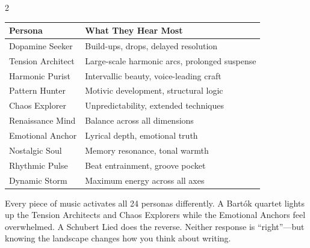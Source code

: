 \documentclass[10pt,a4paper]{article}
\begin{document}
\begin{multicols}{2}
\vspace{4pt}

{\small
\begin{tabular}{@{}p{2.5cm}p{4cm}@{}}
  \toprule
  \textbf{\sffamily Persona} & \textbf{\sffamily What They Hear Most} \\
  \midrule
  \textcolor{alch}{Dopamine Seeker} & Build-ups, drops, delayed resolution \\[2pt]
  \textcolor{alch}{Tension Architect} & Large-scale harmonic arcs, prolonged suspense \\[2pt]
  \textcolor{arch}{Harmonic Purist} & Intervallic beauty, voice-leading craft \\[2pt]
  \textcolor{arch}{Pattern Hunter} & Motivic development, structural logic \\[2pt]
  \textcolor{expl}{Chaos Explorer} & Unpredictability, extended techniques \\[2pt]
  \textcolor{expl}{Renaissance Mind} & Balance across all dimensions \\[2pt]
  \textcolor{anch}{Emotional Anchor} & Lyrical depth, emotional truth \\[2pt]
  \textcolor{anch}{Nostalgic Soul} & Memory resonance, tonal warmth \\[2pt]
  \textcolor{kine}{Rhythmic Pulse} & Beat entrainment, groove pocket \\[2pt]
  \textcolor{kine}{Dynamic Storm} & Maximum energy across all axes \\
  \bottomrule
\end{tabular}
}

\vspace{6pt}

Every piece of music activates all 24 personas differently. A Bart\'{o}k quartet lights up the Tension Architects and Chaos Explorers while the Emotional Anchors feel overwhelmed. A Schubert Lied does the reverse. Neither response is ``right''---but knowing the landscape changes how you think about writing.

\end{multicols}

\vspace{8pt}
\end{document}
